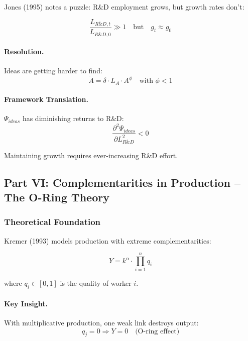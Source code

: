 Jones (1995) notes a puzzle: R\&D employment grows, but growth rates don't:

\begin{equation}
\frac{L_{R\&D,t}}{L_{R\&D,0}} \gg 1 \quad \text{but} \quad g_t \approx g_0
\end{equation}

\paragraph{Resolution.}
Ideas are getting harder to find:
\begin{equation}
\dot{A} = \delta \cdot L_A \cdot A^\phi \quad \text{with } \phi < 1
\end{equation}

\paragraph{Framework Translation.}
$\Psi_{ideas}$ has diminishing returns to R\&D:
\begin{equation}
\frac{\partial^2 \Psi_{ideas}}{\partial L_{R\&D}^2} < 0
\end{equation}

Maintaining growth requires ever-increasing R\&D effort.

\subsection{Part VI: Complementarities in Production – The O-Ring Theory}

\subsubsection{Theoretical Foundation}

Kremer (1993) models production with extreme complementarities:

\begin{equation}
\boxed{
Y = k^\alpha \cdot \prod_{i=1}^n q_i
}
\label{eq:o-ring}
\end{equation}

where $q_i \in [0,1]$ is the quality of worker $i$.

\paragraph{Key Insight.}
With multiplicative production, one weak link destroys output:
\begin{equation}
q_j = 0 \Rightarrow Y = 0 \quad \text{(O-ring effect)}
\end{equation}

